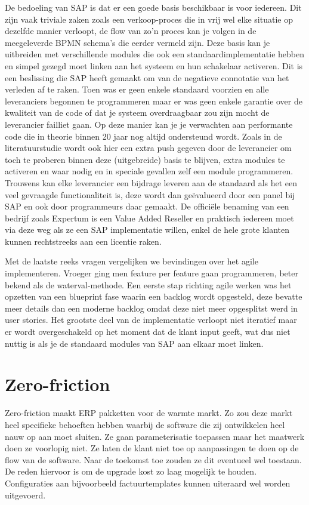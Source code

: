 De bedoeling van SAP is dat er een goede basis beschikbaar is voor iedereen. Dit zijn vaak triviale zaken zoals een verkoop-proces die in vrij wel elke situatie op dezelfde manier verloopt, de flow van zo'n proces kan je volgen in de meegeleverde BPMN schema's die eerder vermeld zijn. Deze basis kan je uitbreiden met verschillende modules die ook een standaardimplementatie hebben en simpel gezegd moet linken aan het systeem en hun schakelaar activeren. Dit is een beslissing die SAP heeft gemaakt om van de negatieve connotatie van het verleden af te raken. Toen was er geen enkele standaard voorzien en alle leveranciers begonnen te programmeren maar er was geen enkele garantie over de kwaliteit van de code of dat je systeem overdraagbaar zou zijn mocht de leverancier failliet gaan. Op deze manier kan je je verwachten aan performante code die in theorie binnen 20 jaar nog altijd ondersteund wordt. Zoals in de literatuurstudie wordt ook hier een extra push gegeven door de leverancier om toch te proberen binnen deze (uitgebreide) basis te blijven, extra modules te activeren en waar nodig en in speciale gevallen zelf een module programmeren. Trouwens kan elke leverancier een bijdrage leveren aan de standaard als het een veel gevraagde functionaliteit is, deze wordt dan geëvalueerd door een panel bij SAP en ook door programmeurs daar gemaakt. De officiële benaming van een bedrijf zoals Expertum is een Value Added Reseller en praktisch iedereen moet via deze weg als ze een SAP implementatie willen, enkel de hele grote klanten kunnen rechtstreeks aan een licentie raken.

Met de laatste reeks vragen vergelijken we bevindingen over het agile implementeren. Vroeger ging men feature per feature gaan programmeren, beter bekend als de waterval-methode. Een eerste stap richting agile werken was het opzetten van een blueprint fase waarin een backlog wordt opgesteld, deze bevatte meer details dan een moderne backlog omdat deze niet meer opgesplitst werd in user stories. Het grootste deel van de implementatie verloopt niet iteratief maar er wordt overgeschakeld op het moment dat de klant input geeft, wat dus niet nuttig is als je de standaard modules van SAP aan elkaar moet linken.


\section{Zero-friction}

Zero-friction maakt ERP pakketten voor de warmte markt. Zo zou deze markt heel specifieke behoeften hebben waarbij de software die zij ontwikkelen heel nauw op aan moet sluiten. Ze gaan parameterisatie toepassen maar het maatwerk doen ze voorlopig niet. Ze laten de klant niet toe op aanpassingen te doen op de flow van de software. Naar de toekomst toe zouden ze dit eventueel wel toestaan. De reden hiervoor is om de upgrade kost zo laag mogelijk te houden. Configuraties aan bijvoorbeeld factuurtemplates kunnen uiteraard wel worden uitgevoerd.